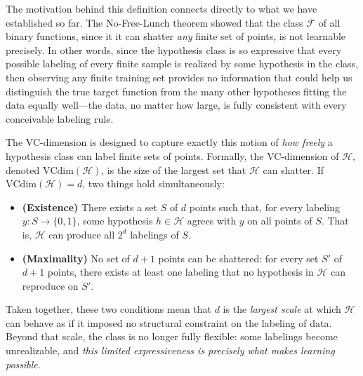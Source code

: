 The motivation behind this definition connects directly to what we have established so far.
The No-Free-Lunch theorem showed that the class $\mathcal{F}$ of all binary functions, since it  it can shatter \emph{any} finite set of points,
  is not
learnable precisely. In other words, since the hypothesis class is
so expressive that every possible labeling of every finite sample is realized by some hypothesis
in the class, then observing any finite training set provides no information that
could help us distinguish the true target function from the many other hypotheses fitting the
data equally well---the data, no matter how large, is fully consistent with every conceivable
labeling rule.

The VC-dimension is designed to capture exactly this notion of \emph{how freely} a hypothesis
class can label finite sets of points. Formally, the VC-dimension of $\mathcal{H}$, denoted
$\mathrm{VCdim}(\mathcal{H})$, is the size of the largest set that $\mathcal{H}$ can shatter.
If $\mathrm{VCdim}(\mathcal{H}) = d$, two things hold simultaneously:
\begin{itemize}
    \item \textbf{(Existence)} There exists a set $S$ of $d$ points such that, for every
    labeling $y \colon S \to \{0,1\}$, some hypothesis $h \in \mathcal{H}$ agrees with $y$ on
    all points of $S$. That is, $\mathcal{H}$ can produce all $2^d$ labelings of $S$.
    \item \textbf{(Maximality)} No set of $d+1$ points can be shattered: for every set $S'$ of
    $d+1$ points, there exists at least one labeling that no hypothesis in $\mathcal{H}$ can
    reproduce on $S'$.
\end{itemize}
Taken together, these two conditions mean that $d$ is the \emph{largest scale} at which
$\mathcal{H}$ can behave as if it imposed no structural constraint on the labeling of data.
Beyond that scale, the class is no longer fully flexible: some labelings become unrealizable,
and \emph{this limited expressiveness is precisely what makes learning possible}.

